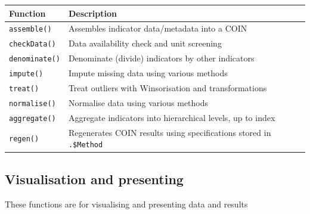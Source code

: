 \documentclass[
]{book}
\begin{document}
\begin{longtable}[]{@{}ll@{}}
\toprule
Function & Description\tabularnewline
\midrule
\endhead
\texttt{assemble()} & Assembles indicator data/metadata into a COIN\tabularnewline
\texttt{checkData()} & Data availability check and unit screening\tabularnewline
\texttt{denominate()} & Denominate (divide) indicators by other indicators\tabularnewline
\texttt{impute()} & Impute missing data using various methods\tabularnewline
\texttt{treat()} & Treat outliers with Winsorisation and transformations\tabularnewline
\texttt{normalise()} & Normalise data using various methods\tabularnewline
\texttt{aggregate()} & Aggregate indicators into hierarchical levels, up to index\tabularnewline
\texttt{regen()} & Regenerates COIN results using specifications stored in \texttt{.\$Method}\tabularnewline
\bottomrule
\end{longtable}

\hypertarget{visualisation-and-presenting}{%
\subsection{Visualisation and presenting}\label{visualisation-and-presenting}}

These functions are for visualising and presenting data and results
\end{document}
